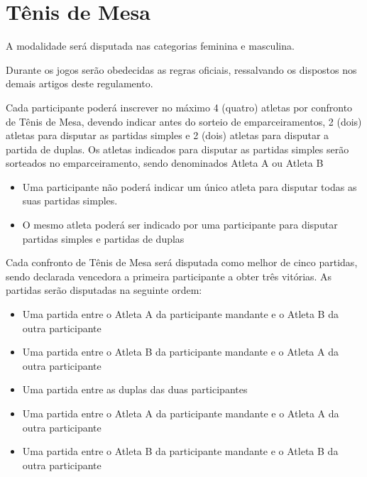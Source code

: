 {\let\clearpage\relax \chapter{Tênis de Mesa}}

\begin{article}
	A modalidade será disputada nas categorias feminina e masculina.
\end{article}

\begin{article}
	Durante os jogos serão obedecidas as regras oficiais, ressalvando os dispostos nos demais artigos deste regulamento.
\end{article}

\begin{article}
	Cada participante poderá inscrever no máximo 4 (quatro) atletas por confronto de Tênis de Mesa, devendo indicar antes do sorteio de emparceiramentos, 2 (dois) atletas para disputar as partidas simples e 2 (dois) atletas para disputar a partida de duplas. Os atletas indicados para disputar as partidas simples serão sorteados no emparceiramento, sendo denominados Atleta A ou Atleta B

	\begin{itemize}[noitemsep]
		\item Uma participante não poderá indicar um único atleta para disputar todas as suas partidas simples.
		\item O mesmo atleta poderá ser indicado por uma participante para disputar partidas simples e partidas de duplas
	\end{itemize}
\end{article}

\noindent
Cada confronto de Tênis de Mesa será disputada como melhor de cinco partidas, sendo declarada vencedora a primeira participante a obter três vitórias. As partidas serão disputadas na seguinte ordem:
\begin{itemize}[noitemsep]
	\item Uma partida entre o Atleta A da participante mandante e o Atleta B da outra participante
	\item Uma partida entre o Atleta B da participante mandante e o Atleta A da outra participante
	\item Uma partida entre as duplas das duas participantes
	\item Uma partida entre o Atleta A da participante mandante e o Atleta A da outra participante
	\item Uma partida entre o Atleta B da participante mandante e o Atleta B da outra participante
\end{itemize}

